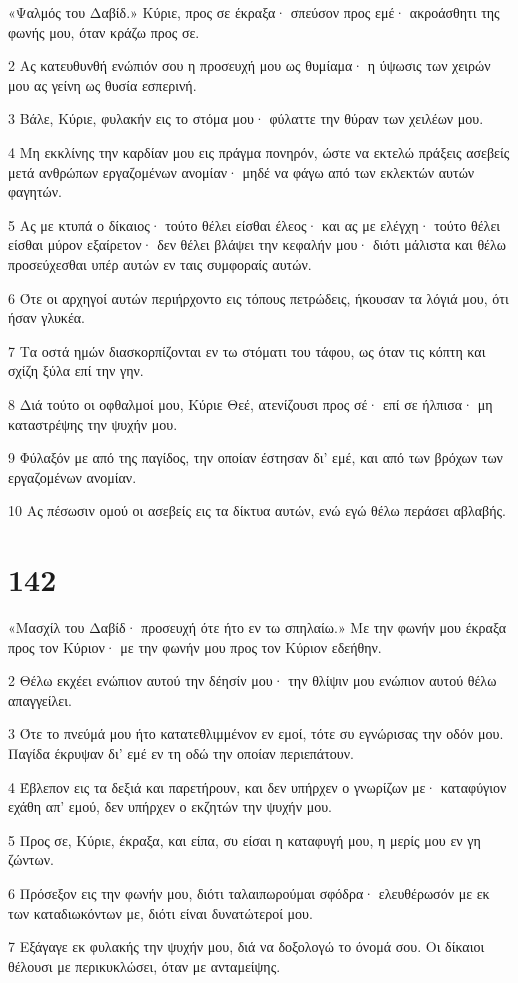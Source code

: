 \par «Ψαλμός του Δαβίδ.» Κύριε, προς σε έκραξα· σπεύσον προς εμέ· ακροάσθητι της φωνής μου, όταν κράζω προς σε.
\par 2 Ας κατευθυνθή ενώπιόν σου η προσευχή μου ως θυμίαμα· η ύψωσις των χειρών μου ας γείνη ως θυσία εσπερινή.
\par 3 Βάλε, Κύριε, φυλακήν εις το στόμα μου· φύλαττε την θύραν των χειλέων μου.
\par 4 Μη εκκλίνης την καρδίαν μου εις πράγμα πονηρόν, ώστε να εκτελώ πράξεις ασεβείς μετά ανθρώπων εργαζομένων ανομίαν· μηδέ να φάγω από των εκλεκτών αυτών φαγητών.
\par 5 Ας με κτυπά ο δίκαιος· τούτο θέλει είσθαι έλεος· και ας με ελέγχη· τούτο θέλει είσθαι μύρον εξαίρετον· δεν θέλει βλάψει την κεφαλήν μου· διότι μάλιστα και θέλω προσεύχεσθαι υπέρ αυτών εν ταις συμφοραίς αυτών.
\par 6 Ότε οι αρχηγοί αυτών περιήρχοντο εις τόπους πετρώδεις, ήκουσαν τα λόγιά μου, ότι ήσαν γλυκέα.
\par 7 Τα οστά ημών διασκορπίζονται εν τω στόματι του τάφου, ως όταν τις κόπτη και σχίζη ξύλα επί την γην.
\par 8 Διά τούτο οι οφθαλμοί μου, Κύριε Θεέ, ατενίζουσι προς σέ· επί σε ήλπισα· μη καταστρέψης την ψυχήν μου.
\par 9 Φύλαξόν με από της παγίδος, την οποίαν έστησαν δι' εμέ, και από των βρόχων των εργαζομένων ανομίαν.
\par 10 Ας πέσωσιν ομού οι ασεβείς εις τα δίκτυα αυτών, ενώ εγώ θέλω περάσει αβλαβής.

\chapter{142}

\par «Μασχίλ του Δαβίδ· προσευχή ότε ήτο εν τω σπηλαίω.» Με την φωνήν μου έκραξα προς τον Κύριον· με την φωνήν μου προς τον Κύριον εδεήθην.
\par 2 Θέλω εκχέει ενώπιον αυτού την δέησίν μου· την θλίψιν μου ενώπιον αυτού θέλω απαγγείλει.
\par 3 Ότε το πνεύμά μου ήτο κατατεθλιμμένον εν εμοί, τότε συ εγνώρισας την οδόν μου. Παγίδα έκρυψαν δι' εμέ εν τη οδώ την οποίαν περιεπάτουν.
\par 4 Έβλεπον εις τα δεξιά και παρετήρουν, και δεν υπήρχεν ο γνωρίζων με· καταφύγιον εχάθη απ' εμού, δεν υπήρχεν ο εκζητών την ψυχήν μου.
\par 5 Προς σε, Κύριε, έκραξα, και είπα, συ είσαι η καταφυγή μου, η μερίς μου εν γη ζώντων.
\par 6 Πρόσεξον εις την φωνήν μου, διότι ταλαιπωρούμαι σφόδρα· ελευθέρωσόν με εκ των καταδιωκόντων με, διότι είναι δυνατώτεροί μου.
\par 7 Εξάγαγε εκ φυλακής την ψυχήν μου, διά να δοξολογώ το όνομά σου. Οι δίκαιοι θέλουσι με περικυκλώσει, όταν με ανταμείψης.

